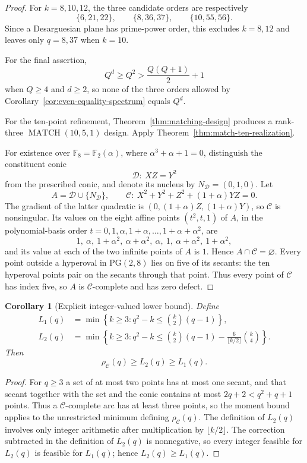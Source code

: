 \documentclass[11pt]{article}
\newtheorem{corollary}[theorem]{Corollary}
\theoremstyle{definition}
\theoremstyle{remark}
\newcommand{\PG}{\mathrm{PG}}
\newcommand{\F}{\mathbb{F}}
\newcommand{\cC}{\mathcal{C}}
\newcommand{\rhoC}{\rho_{\cC}}
\begin{document}
\begin{proof}
For $k=8,10,12$, the three candidate orders are respectively
\[
 \{6,21,22\},\qquad \{8,36,37\},\qquad \{10,55,56\}.
\]
Since a Desarguesian plane has prime-power order, this excludes \(k=8,12\)
and leaves only \(q=8,37\) when \(k=10\).

For the final assertion,
\[
 Q^d\ge Q^2>\frac{Q(Q+1)}2+1
\]
when $Q\ge4$ and $d\ge2$, so none of the three orders allowed by
Corollary~\ref{cor:even-equality-spectrum} equals \(Q^d\).

For the ten-point refinement, Theorem~\ref{thm:matching-design} produces
a rank-three $\operatorname{MATCH}(10,5,1)$ design.  Apply
Theorem~\ref{thm:match-ten-realization}.

For existence over \(\F_8=\F_2(\alpha)\), where
\(\alpha^3+\alpha+1=0\), distinguish the constituent conic
\[
 \mathcal D:\ XZ=Y^2
\]
from the prescribed conic, and denote its nucleus by
\(N_{\mathcal D}=(0,1,0)\).  Let
\[
 A=\mathcal D\cup\{N_{\mathcal D}\},\qquad
 \cC:\ X^2+Y^2+Z^2+(1+\alpha)YZ=0.
\]
The gradient of the latter quadratic is
\((0,(1+\alpha)Z,(1+\alpha)Y)\), so \(\cC\) is nonsingular.  Its values on
the eight affine points \((t^2,t,1)\) of \(A\), in the polynomial-basis
order \(t=0,1,\alpha,1+\alpha,\ldots,1+\alpha+\alpha^2\), are
\[
 1,\ \alpha,\ 1+\alpha^2,\ \alpha+\alpha^2,\
 \alpha,\ 1,\ \alpha+\alpha^2,\ 1+\alpha^2,
\]
and its value at each of the two infinite points of \(A\) is \(1\).
Hence \(A\cap\cC=\varnothing\).  Every point outside a hyperoval in
\(\PG(2,8)\) lies on five of its secants: the ten hyperoval points pair on
the secants through that point.  Thus every point of \(\cC\) has index
five, so \(A\) is \(\cC\)-complete and has zero defect.
\end{proof}

\begin{corollary}[Explicit integer-valued lower bound]\label{cor:exact-integer-bound}
Define
\begin{align*}
 L_1(q)&=\min\left\{k\ge3:q^2-k\le\binom{k}{2}(q-1)\right\},\\
 L_2(q)&=\min\left\{k\ge3:
 q^2-k\le\binom{k}{2}(q-1)
 -\frac{6}{\lfloor k/2\rfloor}\binom{k}{4}\right\}.
\end{align*}
Then
\begin{equation}
 \rhoC(q)\ge L_2(q)\ge L_1(q).
\label{eq:L2}
\end{equation}
\end{corollary}

\begin{proof}
For $q\ge3$ a set of at most two points has at most one secant, and
that secant together with the set and the conic contains at most
$2q+2<q^2+q+1$ points.  Thus a $\cC$-complete arc has at least three points,
so the moment bound applies to the unrestricted minimum defining $\rhoC(q)$.
The definition of $L_2(q)$ involves only integer arithmetic after
multiplication by $\lfloor k/2\rfloor$.
The correction subtracted in the definition of \(L_2(q)\) is nonnegative,
so every integer feasible for \(L_2(q)\) is feasible for \(L_1(q)\); hence
\(L_2(q)\ge L_1(q)\).
\end{proof}
\end{document}
